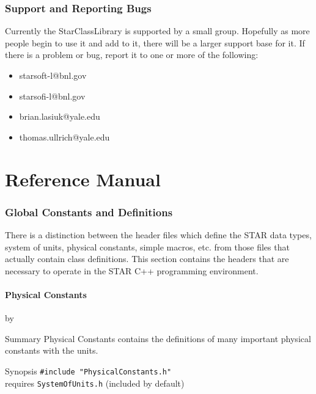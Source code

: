 \documentclass[twoside]{article}
\newcommand{\name}[1]{\textsf{#1}}%
\newcommand{\comp}[1]{\texttt{#1}}%
\newcommand{\entrylabel}[1]{\mbox{\textbf{{#1}}}\hfil}%
\newenvironment{entry}
{\begin{list}{}%
    {\renewcommand{\makelabel}{\entrylabel}%
     \setlength{\labelwidth}{90pt}%
     \setlength{\leftmargin}{\labelwidth}
     \advance\leftmargin by \labelsep%
      }%
    }%
  {\end{list}}
\newcommand{\Entrylabel}[1]%
{\raisebox{0pt}[1ex][0pt]{\makebox[\labelwidth][l]%
    {\parbox[t]{\labelwidth}{\hspace{0pt}\textbf{{#1}}}}}}
\newenvironment{Entry}%
{\renewcommand{\entrylabel}{\Entrylabel}\begin{entry}}%
  {\end{entry}}
\begin{document}
\begin{description}
\section{Support and Reporting Bugs} 
Currently the \name{StarClassLibrary} is supported by a small group.  Hopefully
as more people begin to use it and add to it, there will be a larger
support base for it.  If there is a problem or bug, report it to
one or more of the following:
\begin{itemize}
  \item starsoft-l@bnl.gov
  \item starsofi-l@bnl.gov
  \item brian.lasiuk@yale.edu
  \item thomas.ullrich@yale.edu
\end{itemize}

\clearpage

%
%
\part{Reference Manual}
\clearpage

\section{Global Constants and Definitions}
There is a distinction between the header files which define
the STAR data types, system of units, physical constants,
simple macros, etc. from those files that actually contain
class definitions.  This section contains the headers that
are necessary to operate in the STAR C++ programming environment.


\subsection{Physical Constants} 
\begin{Entry}
\item[Summary]
  Physical Constants contains the definitions of many
  important physical constants with the units.
        

\item[Synopsis]
  \verb+#include "PhysicalConstants.h"+ \\  
  requires \comp{SystemOfUnits.h} (included by default)
  

\end{Entry}
\end{description}
\end{document}
